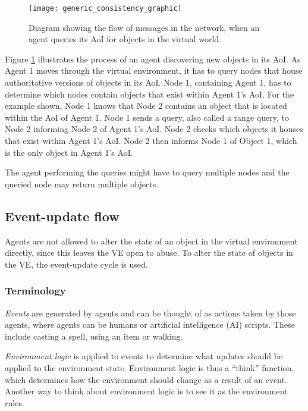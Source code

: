 \begin{figure}[htbp]
 \centering
 \texttt{[image: generic\_consistency\_graphic]}
 \caption{Diagram showing the flow of messages in the network, when an agent queries its AoI for objects in the virtual world.}
 \label{fig_query_flow_graphic}
\end{figure}
%
Figure \ref{fig_query_flow_graphic} illustrates the process of an agent discovering new objects in its AoI. As Agent 1 moves through the virtual environment, it has to query nodes that house authoritative versions of objects in its AoI. Node 1, containing Agent 1, has to determine which nodes contain objects that exist within Agent 1's AoI. For the example shown, Node 1 knows that Node 2 contains an object that is located within the AoI of Agent 1. Node 1 sends a query, also called a range query, to Node 2 informing Node 2 of Agent 1's AoI. Node 2 checks which objects it houses that exist within Agent 1's AoI. Node 2 then informs Node 1 of Object 1, which is the only object in Agent 1's AoI.

The agent performing the queries might have to query multiple nodes and the queried node may return multiple objects.

\subsection{Event-update flow}
\label{event_logic_update}

Agents are not allowed to alter the state of an object in the virtual environment directly, since this leaves the VE open to abuse. To alter the state of objects in the VE, the event-update cycle is used.

\subsubsection{Terminology}
\emph{Events} are generated by agents and can be thought of as actions taken by those agents, where agents can be humans or artificial intelligence (AI) scripts. These include casting a spell, using an item or walking.

\emph{Environment logic} is applied to events to determine what updates should be applied to the environment state. Environment logic is thus a ``think'' function, which determines how the environment should change as a result of an event. Another way to think about environment logic is to see it as the environment rules.

